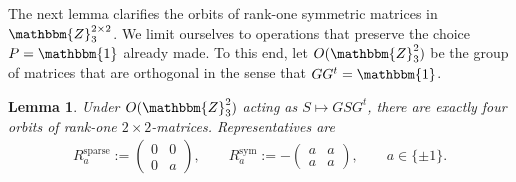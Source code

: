 \documentclass[aps,nofootinbib,floatfix,a4paper]{revtex4}
\newtheorem{lemma}[theorem]{Lemma}
\newcommand{\sym}{^\mathrm{sym}}
\newcommand{\sparse}{^\mathrm{sparse}}
\newcommand{\1}{\mbox{$\mathbf{1}$}}
\def\ZZ{\mathbbm{Z}}
\def\Id{\mathbbm{1}}
\begin{document}
The next lemma clarifies the orbits of rank-one symmetric matrices in $\ZZ_3^{2\times 2}$.
We limit ourselves to operations that preserve the choice $P=\Id$ already made.
To this end,
let $O(\ZZ_3^2)$ be the group of matrices that are orthogonal in the sense that $G G^t=\Id$.


\begin{lemma}\label{lem:orbits}
	Under $O(\ZZ_3^2)$ acting as $S \mapsto G S G^t$, there are exactly four orbits of rank-one $2\times 2$-matrices.
	Representatives are
	\begin{align*}
		R\sparse_a
		:=
		\begin{pmatrix}
			0 & 0 \\
			0 & a
		\end{pmatrix},
		\qquad
		R\sym_a:=
		-
		\begin{pmatrix}
			a & a \\
			a & a
		\end{pmatrix},
		\qquad
		a\in\{\pm1\}.
	\end{align*}
\end{lemma}
\end{document}
